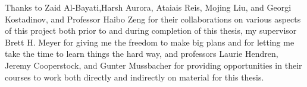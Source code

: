 \documentclass[
12pt, %
oneside, %
english, %
doublespacing, %
]{MastersDoctoralThesis} %
\begin{document}
\begin{acknowledgements}
\addchaptertocentry{\acknowledgementname} %

Thanks to Zaid Al-Bayati,Harsh Aurora, Ataiais Reis, Mojing Liu, and Georgi Kostadinov, and Professor Haibo Zeng for their collaborations on various aspects of this project both prior to and during completion of this thesis,
my supervisor Brett H. Meyer for giving me the freedom to make big plans and for letting me take the time to learn things the hard way,
and professors Laurie Hendren, Jeremy Cooperstock, and Gunter Mussbacher for providing opportunities in their courses to work both directly and indirectly on material for this thesis.


\end{acknowledgements}


\tableofcontents %

\listoffigures %

\listoftables %

\end{document}
